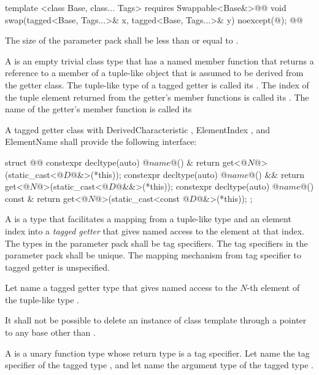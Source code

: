 {\begin{codeblock}
{  template <class Base, class... Tags>
    requires Swappable<Base&>@\newtxt{()}@
  void swap(tagged<Base, Tags...>& x, tagged<Base, Tags...>& y) noexcept(@\seebelow@);
}@\newtxt{\}\}}@
\end{codeblock}

\pnum The size of the  parameter pack shall be less than or equal to
.

\pnum A  is an empty trivial class type that has a named member function that
returns a reference to a member of a tuple-like object that is assumed to be derived from the getter
class. The tuple-like type of a tagged getter is called its .
The index of the tuple element returned from the getter's member functions is called its
. The name of the getter's member function is called its

\pnum A tagged getter class with DerivedCharacteristic , ElementIndex
, and ElementName  shall provide the following interface:

\begin{codeblock}
struct @@ {
  constexpr decltype(auto) @$name$@() &       { return get<@$N$@>(static_cast<@$D$@&>(*this)); }
  constexpr decltype(auto) @$name$@() &&      { return get<@$N$@>(static_cast<@$D$@&&>(*this)); }
  constexpr decltype(auto) @$name$@() const & { return get<@$N$@>(static_cast<const @$D$@&>(*this)); }
};
\end{codeblock}

\pnum A  is a type that facilitates a mapping from a tuple-like type and an
element index into a \textit{tagged getter} that gives named access to the element at that index.
The types in the  parameter pack shall be tag specifiers. The tag specifiers in the
 parameter pack shall be unique. \enternote The mapping mechanism from tag specifier to
tagged getter is unspecified.\exitnote

\pnum Let  name a tagged getter type that gives named
access to the $N$-th element of the tuple-like type .

\pnum It shall not be possible to delete an instance of class template  through a
pointer to any base other than .

\pnum A  is a unary function type whose return type is a tag specifier. Let
 name the tag specifier of the tagged type , and let
 name the argument type of the tagged type .

}
